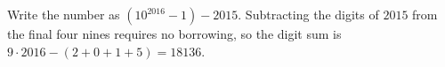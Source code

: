 Write the number as $(10^{2016}-1)-2015$. Subtracting the digits of $2015$ from the final four nines requires no borrowing, so the digit sum is $9\cdot2016-(2+0+1+5)=\boxed{18136}$.
